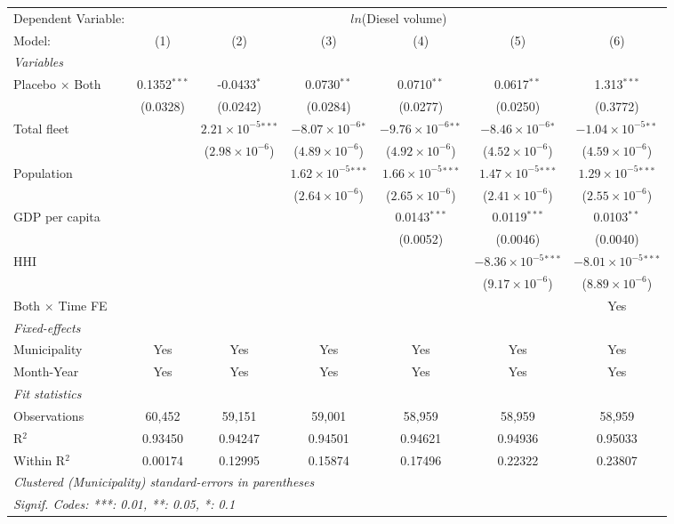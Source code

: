 \documentclass[
]{article}
\begin{document}
\begin{tabular}{lcccccc}
\tabularnewline\midrule\midrule
Dependent Variable:&\multicolumn{6}{c}{$ln$(Diesel volume)}\\
Model:&(1) & (2) & (3) & (4) & (5) & (6)\\
\midrule \emph{Variables}&   &   &   &   &   &  \\
Placebo $\times $ Both & 0.1352$^{***}$ & -0.0433$^{*}$ & 0.0730$^{**}$ & 0.0710$^{**}$ & 0.0617$^{**}$ & 1.313$^{***}$\\
  &(0.0328) & (0.0242) & (0.0284) & (0.0277) & (0.0250) & (0.3772)\\
Total fleet &    & $2.21\times 10^{-5}$$^{***}$ & $-8.07\times 10^{-6}$$^{*}$ & $-9.76\times 10^{-6}$$^{**}$ & $-8.46\times 10^{-6}$$^{*}$ & $-1.04\times 10^{-5}$$^{**}$\\
  &   & ($2.98\times 10^{-6}$) & ($4.89\times 10^{-6}$) & ($4.92\times 10^{-6}$) & ($4.52\times 10^{-6}$) & ($4.59\times 10^{-6}$)\\
Population &    &    & $1.62\times 10^{-5}$$^{***}$ & $1.66\times 10^{-5}$$^{***}$ & $1.47\times 10^{-5}$$^{***}$ & $1.29\times 10^{-5}$$^{***}$\\
  &   &    & ($2.64\times 10^{-6}$) & ($2.65\times 10^{-6}$) & ($2.41\times 10^{-6}$) & ($2.55\times 10^{-6}$)\\
GDP per capita &    &    &    & 0.0143$^{***}$ & 0.0119$^{***}$ & 0.0103$^{**}$\\
  &   &    &    & (0.0052) & (0.0046) & (0.0040)\\
HHI &    &    &    &    & $-8.36\times 10^{-5}$$^{***}$ & $-8.01\times 10^{-5}$$^{***}$\\
  &   &    &    &    & ($9.17\times 10^{-6}$) & ($8.89\times 10^{-6}$)\\
Both $\times$ Time FE &  &  &  &  &  & Yes\\
\midrule \emph{Fixed-effects}&   &   &   &   &   &  \\
Municipality & Yes & Yes & Yes & Yes & Yes & Yes\\
Month-Year & Yes & Yes & Yes & Yes & Yes & Yes\\
\midrule \emph{Fit statistics}&  & & & & & \\
Observations & 60,452&59,151&59,001&58,959&58,959&58,959\\
R$^2$ & 0.93450&0.94247&0.94501&0.94621&0.94936&0.95033\\
Within R$^2$ & 0.00174&0.12995&0.15874&0.17496&0.22322&0.23807\\
\midrule\midrule\multicolumn{7}{l}{\emph{Clustered (Municipality) standard-errors in parentheses}}\\
\multicolumn{7}{l}{\emph{Signif. Codes: ***: 0.01, **: 0.05, *: 0.1}}\\
\end{tabular}
\end{document}
